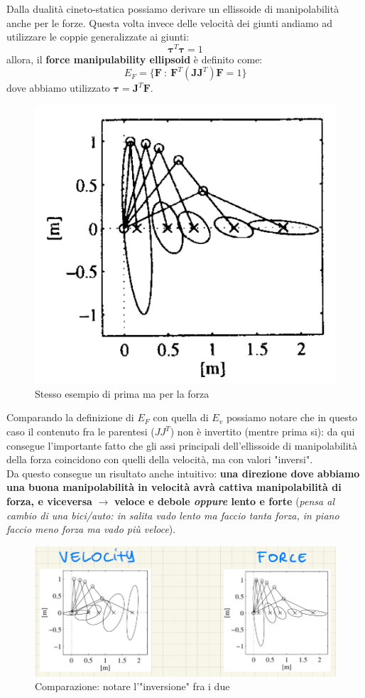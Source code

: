 Dalla dualità cineto-statica possiamo derivare un ellissoide di manipolabilità anche per le forze. Questa volta invece delle velocità dei giunti andiamo ad utilizzare le coppie generalizzate ai giunti:
$$
\bm{\tau}^T\bm{\tau} = 1
$$
allora, il \textbf{force manipulability ellipsoid} è definito come:
$$
E_F = \{\bm{F} \ : \ \bm{F}^T (\bm{J}\bm{J}^T)\bm{F} = 1 \}
$$
dove abbiamo utilizzato $\bm{\tau} = \bm{J}^T\bm{F}$.

\begin{figure}[H]
	\centering
	\includegraphics[width=0.3\linewidth]{images/statics_6}
	\caption{Stesso esempio di prima ma per la forza}
	\label{fig:statics6}
\end{figure}

Comparando la definizione di $E_F$ con quella di $E_v$ possiamo notare che in questo caso il contenuto fra le parentesi ($JJ^T$) non è invertito (mentre prima si): da qui consegue l'importante fatto che gli assi principali dell'ellissoide di manipolabilità della forza coincidono con quelli della velocità, ma con valori "inversi".\\
Da questo consegue un risultato anche intuitivo: \textbf{una direzione dove abbiamo una buona manipolabilità in velocità avrà cattiva manipolabilità di forza, e viceversa} $\rightarrow$ \textbf{veloce e debole \textit{oppure} lento e forte} (\textit{pensa al cambio di una bici/auto: in salita vado lento ma faccio tanta forza, in piano faccio meno forza ma vado più veloce}).

\begin{figure}
	\centering
	\includegraphics[width=0.6\linewidth]{images/statics_7}
	\caption{Comparazione: notare l'"inversione" fra i due}
	\label{fig:statics7}
\end{figure}


